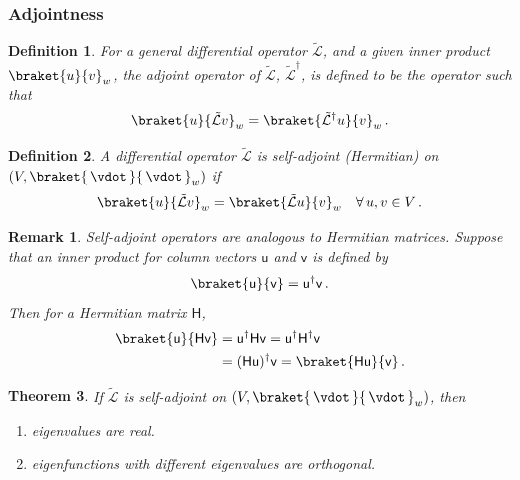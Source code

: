 \documentclass{article}
\theoremstyle{plain}\theoremheaderfont{\normalfont\itshape}\theorembodyfont{\rmfamily}\theoremseparator{.}\newtheorem*{rem}{Remark}\newtheorem*{ex}{Example}\newtheorem*{proof}{Proof}\newtheorem*{altp}{Alternative proof}
\theoremstyle{plain}\theoremheaderfont{\normalfont\bfseries}\theorembodyfont{\rmfamily}\theoremseparator{.}\newtheorem{thm}{Theorem}[section]\newtheorem{lem}[thm]{Lemma}\newtheorem{prop}[thm]{Proposition}\newtheorem*{cor}{Corollary}\newtheorem{defn}[thm]{Definition}\newtheorem{clm}[thm]{Claim}\newtheorem{clminproof}{Claim}
\theoremstyle{break}\theoremheaderfont{\normalfont\itshape}\theorembodyfont{\rmfamily}\theoremseparator{.\medskip}\newtheorem*{proofskip}{Proof}\newtheorem*{exs}{Examples}\newtheorem*{rems}{Remarks}
\theoremstyle{break}\theoremheaderfont{\normalfont\bfseries}\theorembodyfont{\rmfamily}\theoremseparator{.\medskip}\newtheorem{lemskip}[thm]{Lemma}\newtheorem{defnskip}[thm]{Definition}\newtheorem{propskip}[thm]{Proposition}\newtheorem{thmskip}[thm]{Theorem}
\numberwithin{equation}{section}
\begin{document}
	\subsubsection{Adjointness}
	\begin{defn}
		For a general differential operator \(\tilde{\mathcal{L}}\), and a given inner product \(\braket{u}{v}_w\), the \textit{adjoint operator} of \(\tilde{\mathcal{L}}\), \(\tilde{\mathcal{L}}^\dagger\), is defined to be the operator such that
		\[\braket{u}{\tilde{\mathcal{L}}v}_w=\braket{\tilde{\mathcal{L}}^\dagger u}{v}_w\,.\]
	\end{defn}
	\begin{defn}
		A differential operator \(\tilde{\mathcal{L}}\) is \textit{self-adjoint} (\textit{Hermitian}) on \((V,\braket{\,\vdot\,}{\,\vdot\,}_w)\) if
		\[\braket{u}{\tilde{\mathcal{L}}v}_w=\braket{\tilde{\mathcal{L}}u}{v}_w\quad\forall\, u,v\in V\,.\]
	\end{defn}
	\begin{rem}
		Self-adjoint operators are analogous to Hermitian matrices. Suppose that an inner product for column vectors \(\mathsf{u}\) and \(\mathsf{v}\) is defined by
		\[\braket{\mathsf{u}}{\mathsf{v}}=\mathsf{u}^\dagger\mathsf{v}\,.\]
		Then for a Hermitian matrix \(\mathsf{H}\),
		\begin{align*}
			\braket{\mathsf{u}}{\mathsf{Hv}}&=\mathsf{u^\dagger Hv}=\mathsf{u^\dagger H^\dagger v}\\
			&=\mathsf{(Hu)^\dagger v}=\braket{\mathsf{Hu}}{\mathsf{v}}\,.
		\end{align*}
	\end{rem}
	\begin{thm}
		If \(\tilde{\mathcal{L}}\) is self-adjoint on \((V,\braket{\,\vdot\,}{\,\vdot\,}_w)\), then
		\begin{enumerate}[topsep=0pt]
			\item eigenvalues are real.
			\item eigenfunctions with different eigenvalues are orthogonal.
		\end{enumerate}
	\end{thm}
\end{document}
